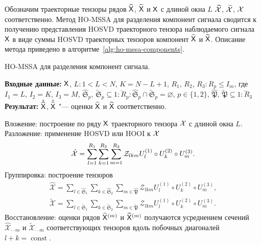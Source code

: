 \documentclass[specialist,
  substylefile=spbu_report.rtx,
subf,href,colorlinks=true, 12pt]{disser}
\theoremstyle{plain}
\theoremstyle{definition}
\theoremstyle{remark}
\newcommand{\Input}{\textbf{Входные данные: }}
\newcommand{\Output}{\textbf{Результат: }}
\begin{document}
Обозначим траекторные тензоры рядов $\widehat{\mathsf{X}}$,
$\widetilde{\mathsf{X}}$ и $\mathsf{X}$ с длиной окна $L$
$\widehat{\mathcal{X}}$, $\widetilde{\mathcal{X}}$, $\mathcal{X}$ соответственно.
Метод HO-MSSA для разделения компонент сигнала сводится к
получению представления HOSVD траекторного тензора
наблюдаемого сигнала $\mathsf{X}$ в виде суммы HOSVD траекторных тензоров
компонент $\widehat{\mathsf{X}}$ и $\widetilde{\mathsf{X}}$.
Описание метода приведено в алгоритме~\ref{alg:ho-mssa-components}.
\begin{algorithm}[!ht]
  \caption{HO-MSSA для разделения компонент сигнала.}
  \label{alg:ho-mssa-components}
  \Input $\mathsf{X}$,
  $L: 1< L < N$, $K = N - L + 1$,
  $R_1$, $R_2$, $R_3: R_p \leqslant I_m$, где $I_1=L$, $I_2=K$, $I_3=M$,
  $\widehat{\mathfrak{S}}_p,\, \widetilde{\mathfrak{S}}_p \subseteq
  \overline{1:R_p}:
  \widehat{\mathfrak{S}}_p \cap \widetilde{\mathfrak{S}}_p = \varnothing$,
  $p \in \{1, 2\}$,
  $\widehat{\mathfrak{P}},\, \widetilde{\mathfrak{P}}  \subseteq
  \overline{1:R_3}$\\
  \Output $\mathring{\widehat{\mathsf{X}}}$, $\mathring{\widetilde{\mathsf{X}}}$
  "--- оценки $\widehat{\mathsf{X}}$ и $\widetilde{\mathsf{X}}$
  соответственно.
  \begin{algorithmic}[1]
    \State Вложение: построение по ряду $\mathsf{X}$ траекторного тензора $\mathcal{X}$
    с длиной окна $L$. \label{algstep:ho-mssa-inj}
    \State Разложение: применение HOSVD или HOOI к $\mathcal{X}$
    \label{algstep:ho-mssa-decomp}
    \begin{equation*}
      \mathring{\mathcal{X}} = \sum_{l=1}^{R_1} \sum_{k=1}^{R_2} \sum_{m=1}^{R_3}
      \mathcal{Z}_{lkm} U_l^{(1)}\circ U_k^{(2)} \circ U_m^{(3)}.
      \label{eq:ho-mssa}
    \end{equation*}
    \State Группировка: построение тензоров
    \begin{gather*}
      \widehat{\mathcal{X}}=\sum_{l \in \widehat{\mathfrak{S}}_1}
      \sum_{k\in \widehat{\mathfrak{S}}_2}
      \sum_{m\in \widehat{\mathfrak{P}}}
      \mathcal{Z}_{lkm} U^{(1)}_{l}\circ U^{(2)}_{k} \circ U^{(3)}_{m},\\
      \widetilde{\mathcal{X}}=\sum_{l \in \widetilde{\mathfrak{S}}_1}
      \sum_{k\in \widetilde{\mathfrak{S}}_2}
      \sum_{m\in \widetilde{\mathfrak{P}}}
      \mathcal{Z}_{lkm} U^{(1)}_{l}\circ U^{(2)}_{k} \circ U^{(3)}_{m}.
    \end{gather*}
    \State %
    Восстановление: оценки рядов $\widehat{\mathsf{X}}^{(m)}$ и
    $\widetilde{\mathsf{X}}^{(m)}$ получаются усреднением сечений
    $\widehat{\mathcal{X}}_{\cdot \cdot m}$
    и $\widetilde{\mathcal{X}}_{\cdot\cdot m}$ соответствующих
    тензоров вдоль побочных диагоналей $l+k = \operatorname{const}$.
  \end{algorithmic}
\end{algorithm}
\end{document}
